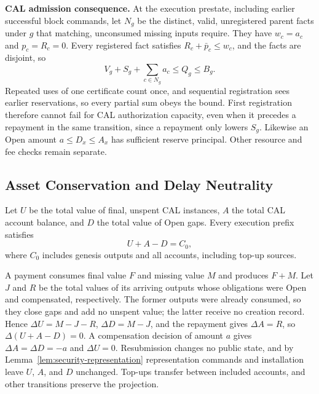 \noindent\textbf{CAL admission consequence.}
At the execution prestate, including earlier successful block commands, let $N_g$ be the distinct, valid, unregistered parent facts under $g$ that matching, unconsumed missing inputs require. They have $w_c=a_c$ and $p_c=R_c=0$. Every registered fact satisfies $R_c+\bar p_c\le w_c$, and the facts are disjoint, so
\begin{equation}
 V_g+S_g+\sum_{c\in N_g}a_c\le Q_g\le B_g.
 \label{eq:security-admission}
\end{equation}
Repeated uses of one certificate count once, and sequential registration sees earlier reservations, so every partial sum obeys the bound. First registration therefore cannot fail for CAL authorization capacity, even when it precedes a repayment in the same transition, since a repayment only lowers $S_g$. Likewise an Open amount $a\le D_x\le A_x$ has sufficient reserve principal. Other resource and fee checks remain separate.

\subsection{Asset Conservation and Delay Neutrality}
\label{sec:security-conservation}

\begin{theorem}
\label{thm:security-conservation}
Let $U$ be the total value of final, unspent CAL instances, $A$ the total
CAL account balance, and $D$ the total value of Open gaps. Every
execution prefix satisfies
\begin{equation}
 U+A-D=C_0,
 \label{eq:security-conservation}
\end{equation}
where $C_0$ includes genesis outputs and all accounts, including top-up
sources.
\end{theorem}
\begin{IEEEproof}
A payment consumes final value $F$ and missing value $M$ and produces $F+M$. Let $J$ and $R$ be the total values of its arriving outputs whose obligations were Open and compensated, respectively. The former outputs were already consumed, so they close gaps and add no unspent value; the latter receive no creation record. Hence $\Delta U=M-J-R$, $\Delta D=M-J$, and the repayment gives $\Delta A=R$, so $\Delta(U+A-D)=0$. A compensation decision of amount $a$ gives $\Delta A=\Delta D=-a$ and $\Delta U=0$. Resubmission changes no public state, and by Lemma~\ref{lem:security-representation} representation commands and installation leave $U$, $A$, and $D$ unchanged. Top-ups transfer between included accounts, and other transitions preserve the projection.
\end{IEEEproof}

